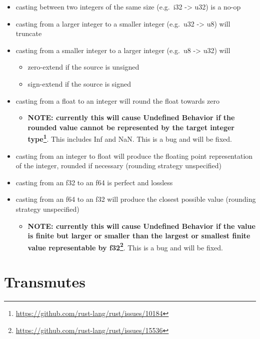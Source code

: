 \documentclass[a4paper,]{book}
\renewcommand{\href}[2]{#2\footnote{\url{#1}}}
\begin{document}
\begin{itemize}
\itemsep1pt\parskip0pt
\item
  casting between two integers of the same size (e.g.~i32
  -\textgreater{} u32) is a no-op
\item
  casting from a larger integer to a smaller integer (e.g.~u32
  -\textgreater{} u8) will truncate
\item
  casting from a smaller integer to a larger integer (e.g.~u8
  -\textgreater{} u32) will

  \begin{itemize}
  \itemsep1pt\parskip0pt
  \item
    zero-extend if the source is unsigned
  \item
    sign-extend if the source is signed
  \end{itemize}
\item
  casting from a float to an integer will round the float towards zero

  \begin{itemize}
  \itemsep1pt\parskip0pt
  \item
    \textbf{\href{https://github.com/rust-lang/rust/issues/10184}{NOTE:
    currently this will cause Undefined Behavior if the rounded value
    cannot be represented by the target integer type}}. This includes
    Inf and NaN. This is a bug and will be fixed.
  \end{itemize}
\item
  casting from an integer to float will produce the floating point
  representation of the integer, rounded if necessary (rounding strategy
  unspecified)
\item
  casting from an f32 to an f64 is perfect and lossless
\item
  casting from an f64 to an f32 will produce the closest possible value
  (rounding strategy unspecified)

  \begin{itemize}
  \itemsep1pt\parskip0pt
  \item
    \textbf{\href{https://github.com/rust-lang/rust/issues/15536}{NOTE:
    currently this will cause Undefined Behavior if the value is finite
    but larger or smaller than the largest or smallest finite value
    representable by f32}}. This is a bug and will be fixed.
  \end{itemize}
\end{itemize}

\section{Transmutes}\label{sec--transmutes}
\end{document}
